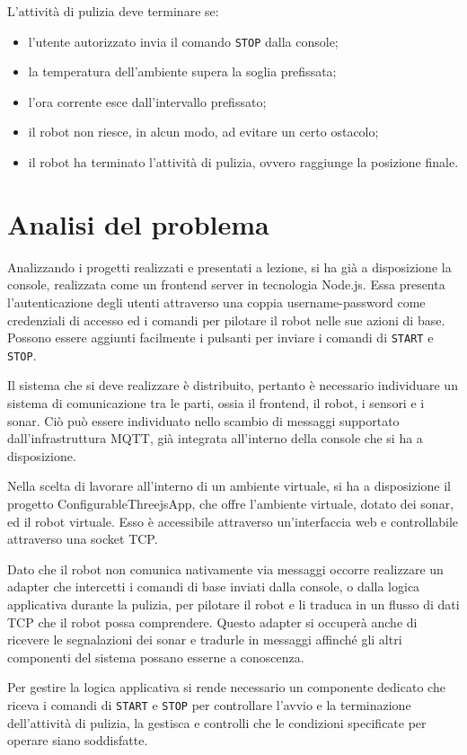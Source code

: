 L'attività di pulizia deve terminare se:
\begin{itemize}
\item l'utente autorizzato invia il comando \texttt{STOP} dalla console;
\item la temperatura dell'ambiente supera la soglia prefissata;
\item l'ora corrente esce dall'intervallo prefissato;
\item il robot non riesce, in alcun modo, ad evitare un certo ostacolo;
\item il robot ha terminato l'attività di pulizia, ovvero raggiunge la posizione finale.
\end{itemize}

\section{Analisi del problema}
Analizzando i progetti realizzati e presentati a lezione, si ha già a disposizione la console, realizzata come un frontend server in tecnologia Node.js. Essa presenta l'autenticazione degli utenti attraverso una coppia username-password come credenziali di accesso ed i comandi per pilotare il robot nelle sue azioni di base. Possono essere aggiunti facilmente i pulsanti per inviare i comandi di \texttt{START} e \texttt{STOP}.

Il sistema che si deve realizzare è distribuito, pertanto è necessario individuare un sistema di comunicazione tra le parti, ossia il frontend, il robot, i sensori e i sonar. Ciò può essere individuato nello scambio di messaggi supportato dall'infrastruttura MQTT, già integrata all'interno della console che si ha a disposizione. 

Nella scelta di lavorare all'interno di un ambiente virtuale, si ha a disposizione il progetto ConfigurableThreejsApp, che offre l'ambiente virtuale, dotato dei sonar, ed il robot virtuale. Esso è accessibile attraverso un'interfaccia web e controllabile attraverso una socket TCP.

Dato che il robot non comunica nativamente via messaggi occorre realizzare un adapter che intercetti i comandi di base inviati dalla console, o dalla logica applicativa durante la pulizia, per pilotare il robot e li traduca in un flusso di dati TCP che il robot possa comprendere. Questo adapter si occuperà anche di ricevere le segnalazioni dei sonar e tradurle in messaggi affinché gli altri componenti del sistema possano esserne a conoscenza.

Per gestire la logica applicativa si rende necessario un componente dedicato che riceva i comandi di \texttt{START} e \texttt{STOP} per controllare l'avvio e la terminazione dell'attività di pulizia, la gestisca e controlli che le condizioni specificate per operare siano soddisfatte.

